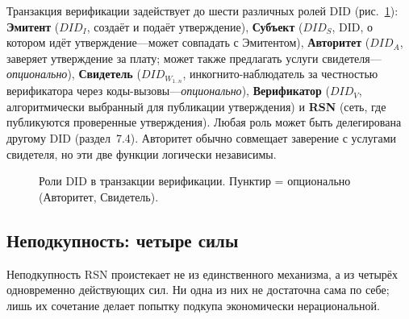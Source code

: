 \documentclass[11pt,a4paper,twocolumn]{article}
\begin{document}
Транзакция верификации задействует до шести различных ролей DID (рис.~\ref{fig:roles}): \textbf{Эмитент} ($DID_I$, создаёт и подаёт утверждение), \textbf{Субъект} ($DID_S$, DID, о котором идёт утверждение---может совпадать с Эмитентом), \textbf{Авторитет} ($DID_A$, заверяет утверждение за плату; может также предлагать услуги свидетеля---\emph{опционально}), \textbf{Свидетель} ($DID_{W_{1..n}}$, инкогнито-наблюдатель за честностью верификатора через коды-вызовы---\emph{опционально}), \textbf{Верификатор} ($DID_V$, алгоритмически выбранный для публикации утверждения) и \textbf{RSN} (сеть, где публикуются проверенные утверждения). Любая роль может быть делегирована другому DID (раздел~7.4). Авторитет обычно совмещает заверение с услугами свидетеля, но эти две функции логически независимы.

\begin{figure}[ht]
\centering
{}
\caption{Роли DID в транзакции верификации. Пунктир = опционально (Авторитет, Свидетель).}
\label{fig:roles}
\end{figure}

\subsection{Неподкупность: четыре силы}

Неподкупность RSN проистекает не из единственного механизма, а из четырёх одновременно действующих сил. Ни одна из них не достаточна сама по себе; лишь их сочетание делает попытку подкупа экономически нерациональной.
\end{document}
